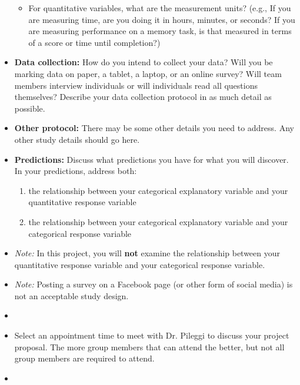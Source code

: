 \documentclass[letterpaper,12pt]{report}
\begin{document}
\begin{itemize}
\begin{itemize}
    \item For quantitative variables, what are the measurement units? (e.g., If you are measuring time, are you doing it in hours, minutes, or seconds?  If you are measuring performance on a memory task, is that measured in terms of a score or time until completion?)
    \end{itemize}
    \item \textbf{Data collection:}  How do you intend to collect your data?  Will you be marking data on paper, a tablet, a laptop, or an online survey?  Will team members interview individuals or will individuals read all questions themselves?  Describe your data collection protocol in as much detail as possible.
    \item \textbf{Other protocol:}  There may be some other details you need to address.  Any other study details should go here.
    \item \textbf{Predictions:}  Discuss what predictions you have for what you will discover.  In your predictions, address both:
    \begin{enumerate}
    \item the relationship between your categorical explanatory variable and your quantitative response variable
    \item the relationship between your categorical explanatory variable and your categorical response variable
        \end{enumerate}
        \item[] \emph{Note:} In this project, you will \textbf{not} examine the relationship between your quantitative response variable and your categorical response variable.
        \item[] \emph{Note:} Posting a survey on a Facebook page (or other form of social media) is not an acceptable study design.
\item[]
\end{itemize}


\begin{itemize}
\item Select an appointment time to meet with Dr. Pileggi to discuss your project proposal.  The more group members that can attend the better, but not all group members are required to attend.
\item[]
\end{itemize}
\end{document}
